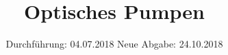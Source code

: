

\subject{V21}
\title{Optisches Pumpen}
\date{
  Durchführung: 04.07.2018
  \hspace{3em}
  Neue Abgabe: 24.10.2018
}



\maketitle
\thispagestyle{empty}
\tableofcontents
\newpage
\setcounter{page}{1}





\printbibliography


